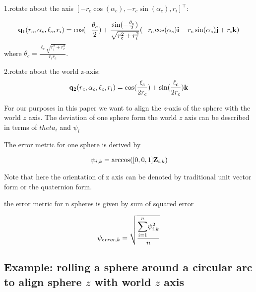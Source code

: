 \documentclass[letter paper, 10pt, conference]{ieeeconf}
\begin{document}
1.rotate about the axis $[ -r_c \cos(\alpha_c), -r_c\sin(\alpha_c),r_i]^\top$:

\begin{align}
{\bf q}_1(r_c, \alpha_c, \ell_c, r_i)   = \cos( -\frac{\theta_c}{2})+ \frac{\sin({-\frac{\theta_c}{2}})}{\sqrt{r_c^2+r_i^2}}(-r_c\cos(\alpha_c){\bf i}-r_c\sin(\alpha_c){\bf j}+r_i{\bf k}) \label{eq:RotatingAboutACircleArc1}
\end{align}
where $\theta_c=\frac{\ell_c\sqrt{r_i^2+r_c^2}}{r_ir_c}$.

2.rotate about the world z-axis:
\begin{align}
{\bf q}_2(r_c, \alpha_c, \ell_c, r_i)=\cos(\frac{\ell_c}{2r_c})+\sin(\frac{\ell_c}{2r_c}){\bf k}\label{eq:RotatingAboutACircleArc2}
\end{align}

For our purposes in this paper we want to align the $z$-axis of the sphere with the world $z$ axis.  The deviation of one sphere form the world  $z$ axis can be described in terms of $theta_i$ and $\psi_i$  


 The error metric for one sphere is derived by
 
\begin{align}
\psi_{i,k} = \arccos([0,0,1]{\bf Z}_{i,k}) \label{eq:errorForOneSphere}
\end{align}

Note that here the orientation of z axis can be denoted by traditional unit vector form or the quaternion form.

 the error metric for n spheres is given by sum of squared error
 
\begin{align}
\psi_{error,k} = \sqrt{\frac{\mathlarger{\sum}_{i=1}^{n}\psi_{i,k}^2}{n}} \label{eq:errorForManySpheres}
\end{align}



\subsection{Example: rolling a sphere around a circular arc to align sphere $z$ with world $z$ axis}
\end{document}
